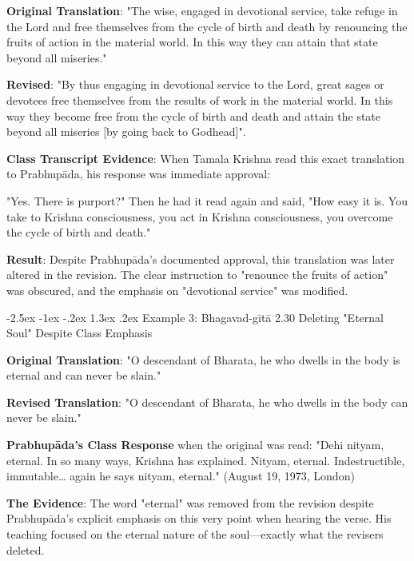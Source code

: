 \documentclass[12pt,twoside]{book}
\makeatletter
\renewcommand\section{\@startsection{section}{1}{\z@}%
{-2.5ex \@plus -1ex \@minus -.2ex}%
{1.3ex \@plus.2ex}%
{\normalfont\Large\bfseries}}
\makeatother
\begin{document}
\textbf{\textbf{Original Translation}}: "The wise, engaged in devotional service, take refuge in the Lord and free themselves from the cycle of birth and death by renouncing the fruits of action in the material world. In this way they can attain that state beyond all miseries."

\textbf{\textbf{Revised}}: "By thus engaging in devotional service to the Lord, great sages or devotees free themselves from the results of work in the material world. In this way they become free from the cycle of birth and death and attain the state beyond all miseries [by going back to Godhead]".

\textbf{\textbf{Class Transcript Evidence}}: When Tamala Krishna read this exact translation to Prabhupāda, his response was immediate approval:

"Yes. There is purport?" Then he had it read again and said, "How easy it is. You take to Krishna consciousness, you act in Krishna consciousness, you overcome the cycle of birth and death." 

\textbf{\textbf{Result}}: Despite Prabhupāda's documented approval, this translation was later altered in the revision. The clear instruction to "renounce the fruits of action" was obscured, and the emphasis on "devotional service" was modified.

\vspace{-0.3cm}
\section{Example 3: Bhagavad-gītā 2.30}
\label{sec:org814a7f6}
Deleting "Eternal Soul" Despite Class Emphasis

\textbf{\textbf{Original Translation}}: "O descendant of Bharata, he who dwells in the body is eternal and can never be slain."

\textbf{\textbf{Revised Translation}}: "O descendant of Bharata, he who dwells in the body can never be slain."

\textbf{\textbf{Prabhupāda's Class Response}} when the original was read:
"Dehi nityam, eternal. In so many ways, Krishna has explained. Nityam, eternal. Indestructible, immutable\ldots{} again he says nityam, eternal." (August 19, 1973, London)

\textbf{\textbf{The Evidence}}: The word "eternal" was removed from the revision despite Prabhupāda's explicit emphasis on this very point when hearing the verse. His teaching focused on the eternal nature of the soul—exactly what the revisers deleted.
\end{document}
